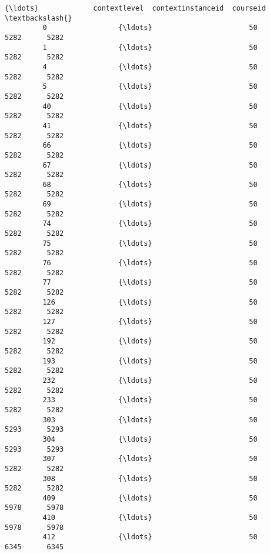 \documentclass[11pt]{article}
\begin{document}
\begin{Verbatim}[commandchars=\\\{\}]
                           {\ldots}             contextlevel  contextinstanceid  courseid  \textbackslash{}
         0                 {\ldots}                       50               5282      5282   
         1                 {\ldots}                       50               5282      5282   
         4                 {\ldots}                       50               5282      5282   
         5                 {\ldots}                       50               5282      5282   
         40                {\ldots}                       50               5282      5282   
         41                {\ldots}                       50               5282      5282   
         66                {\ldots}                       50               5282      5282   
         67                {\ldots}                       50               5282      5282   
         68                {\ldots}                       50               5282      5282   
         69                {\ldots}                       50               5282      5282   
         74                {\ldots}                       50               5282      5282   
         75                {\ldots}                       50               5282      5282   
         76                {\ldots}                       50               5282      5282   
         77                {\ldots}                       50               5282      5282   
         126               {\ldots}                       50               5282      5282   
         127               {\ldots}                       50               5282      5282   
         192               {\ldots}                       50               5282      5282   
         193               {\ldots}                       50               5282      5282   
         232               {\ldots}                       50               5282      5282   
         233               {\ldots}                       50               5282      5282   
         303               {\ldots}                       50               5293      5293   
         304               {\ldots}                       50               5293      5293   
         307               {\ldots}                       50               5282      5282   
         308               {\ldots}                       50               5282      5282   
         409               {\ldots}                       50               5978      5978   
         410               {\ldots}                       50               5978      5978   
         412               {\ldots}                       50               6345      6345   

\end{Verbatim}
\end{document}
